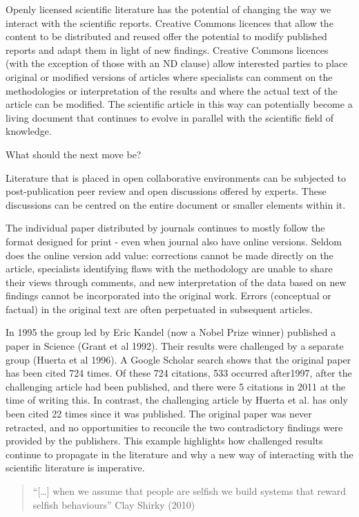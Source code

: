 \documentclass[final,authoryear,3p]{elsarticle-open-drafting}
\begin{document}
Openly licensed scientific literature has the potential of changing the way we interact with the scientific reports. Creative Commons licences that allow the content to be distributed and reused offer the potential to modify published reports and adapt them in light of new findings. Creative Commons licences (with the exception of those with an ND clause) allow interested parties to place original or modified versions of articles where specialists can comment on the methodologies or interpretation of the results and where the actual text of the article can be modified. The scientific article in this way can potentially become a living document that continues to evolve in parallel with the scientific field of knowledge. 

What should the next move be?

Literature that is placed in open collaborative environments can be subjected to post-publication peer review and open discussions offered by experts. These discussions can be centred on the entire document or smaller elements within it. 

The individual paper distributed by journals continues to mostly follow the format designed for print - even when journal also have online versions. Seldom does the online version add value: corrections cannot be made directly on the article, specialists identifying flaws with the methodology are unable to share their views through comments, and new interpretation of the data based on new findings cannot be incorporated into the original work. Errors (conceptual or factual) in the original text are often perpetuated in subsequent articles.

In 1995 the group led by Eric Kandel (now a Nobel Prize winner) published a paper in Science (Grant et al 1992). Their results were challenged by a separate group (Huerta et al 1996). A Google Scholar search shows that the original paper has been cited 724 times. Of these 724 citations, 533 occurred after1997, after the challenging article had been published, and there were 5 citations in 2011 at the time of writing this. In contrast, the challenging article by Huerta et al. has only been cited 22 times since it was published. The original paper was never retracted, and no opportunities to reconcile the two contradictory findings were provided by the publishers. This example highlights how challenged results continue to propagate in the literature and why a new way of interacting with the scientific literature is imperative. 

\begin{quote}
“[…] when we assume that people are selfish we build systems that reward selfish behaviours” Clay Shirky (2010)
\end{quote}
\end{document}
